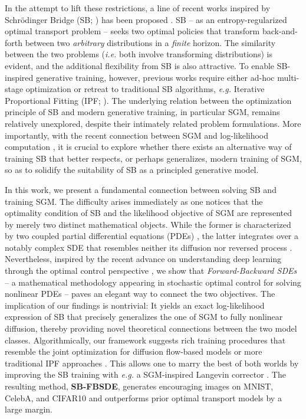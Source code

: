 \documentclass{article}
\newcommand{\eg}{{\ignorespaces\emph{e.g.}}{ }}
\newcommand{\ie}{{\ignorespaces\emph{i.e.}}{ }}
\begin{document}
In the attempt to lift these restrictions,
a line of recent works
inspired by Schr{\"o}dinger Bridge (SB; \citet{schrodinger1932theorie})
has been proposed \citep{de2021diffusion,wang2021deep,vargas2021solving}.
SB -- as an {entropy-regularized} optimal transport problem --
seeks two optimal policies that transform back-and-forth between two \textit{arbitrary} distributions in a \textit{finite} horizon.
The similarity between the two problems (\ie both involve transforming distributions) is evident,
and the additional flexibility from SB
{is also attractive}.
To enable SB-inspired generative training,
however,
previous works
require either {ad-hoc} multi-stage optimization
or retreat to traditional SB algorithms, \eg Iterative Proportional Fitting
(IPF; \citet{kullback1968probability}).
The underlying relation between the optimization principle of SB and modern generative training,
in particular SGM,
remains relatively unexplored, despite their intimately related problem formulations.
More importantly, with
the recent connection between SGM and log-likelihood computation
\citep{song2021maximum},
it is crucial to explore whether there exists an alternative way of training SB that
better respects, or perhaps generalizes, modern training of SGM,
so as to solidify the suitability of SB as a principled generative model.


In this work, we present a
fundamental connection between solving SB and training SGM.
The difficulty arises immediately as one notices that
the optimality condition of SB and the likelihood objective of SGM
are represented by merely two distinct mathematical objects.
While the former is characterized by two coupled partial differential equations (PDEs)
\citep{leonard2013survey},
the latter integrates over a notably complex SDE that resembles neither its diffusion nor reversed process
\citep{song2021maximum}.
Nevertheless,
inspired by the recent advance on understanding deep learning through the optimal control perspective \citep{li2018optimal,liu2021differential,liu2021dynamic},
we show that \textit{Forward-Backward SDEs} --
a mathematical methodology appearing in stochastic optimal control
for solving nonlinear PDEs \citep{han2018solving}
-- paves an elegant way to connect the two objectives.
The implication of our findings is nontrivial:
{
  It yields an exact log-likelihood expression of SB
  that precisely generalizes the one of SGM \citep{song2021maximum} to fully nonlinear diffusion,
  thereby providing novel theoretical connections between the two model classes.
  Algorithmically, our framework suggests rich training procedures that resemble
  the joint optimization for diffusion flow-based models \citep{zhang2021diffusion}
  or more traditional IPF approaches \citep{kullback1968probability,de2021diffusion}.
  This allows one to marry the best of both worlds by improving the SB training with
  \eg a SGM-inspired Langevin corrector \citep{song2019generative}.}
The resulting method, \textbf{SB-FBSDE},
generates encouraging images on MNIST, CelebA, and CIFAR10
and outperforms prior optimal transport models by a large margin.
\end{document}

